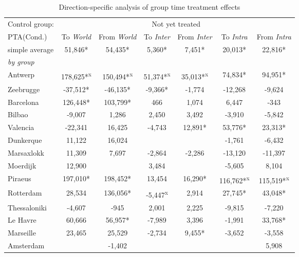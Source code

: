 \begin{table}[ht]
\centering
\caption{Direction-specific analysis of group time treatment effects} 
\begingroup\begin{adjustbox}{max width=\textwidth}
\begin{tabular}{lcccccc}
  \hline
\hline
Control group: & \multicolumn{6}{c}{Not yet treated} \\
 \cmidrule(lr){2-7} PTA(Cond.) & To \emph{World} & From \emph{World} & To \emph{Inter} & From \emph{Inter} & To \emph{Intra} & From \emph{Intra}  \\ 
  \hline
simple average &  51,846* &  54,435* &   5,360* &   7,451* &  20,013* &  22,816* \\ 
   [1ex]\emph{by group} &  &  &  &  &  &  \\ 
   \hline
Antwerp & 178,625*\textsuperscript{x} & 150,494*\textsuperscript{x} &  51,374*\textsuperscript{x} &  35,013*\textsuperscript{x} &  74,834* &  94,951* \\ 
  Zeebrugge & -37,512* & -46,135* &  -9,366* &  -1,774 & -12,268 &  -9,624 \\ 
  Barcelona & 126,448* & 103,799* &     466 &   1,074 &   6,447 &    -343 \\ 
  Bilbao &  -9,007 &   1,286 &   2,450 &   3,492 &  -3,910 &  -5,842 \\ 
  Valencia & -22,341 &  16,425 &  -4,743 &  12,891* &  53,776* &  23,313* \\ 
  Dunkerque &  11,122 &  16,024 &  &  &  -1,761 &  -6,432 \\ 
  Marsaxlokk &  11,309 &   7,697 &  -2,864 &  -2,286 & -13,120 & -11,397 \\ 
  Moerdijk &  12,900 &  &   3,484 &  &  -5,605 &   8,104 \\ 
  Piraeus & 197,010* & 198,452* &  13,454 &  16,290* & 116,762*\textsuperscript{x} & 115,519*\textsuperscript{x} \\ 
  Rotterdam &  28,534 & 136,056* &  -5,447\textsuperscript{x} &   2,914 &  27,745* &  43,048* \\ 
  Thessaloniki &  -4,607 &    -945 &   2,001 &   2,225 &  -9,815 &  -7,220 \\ 
  Le Havre &  60,666 &  56,957* &  -7,989 &   3,396 &  -1,991 &  33,768* \\ 
  Marseille &  23,465 &  25,529 &  -2,734 &   9,455* &  -3,652 &  -3,558 \\ 
  Amsterdam &  &  -1,402 &  &  &  &   5,908 \\ 

\end{tabular}
\end{adjustbox}
\end{table}
